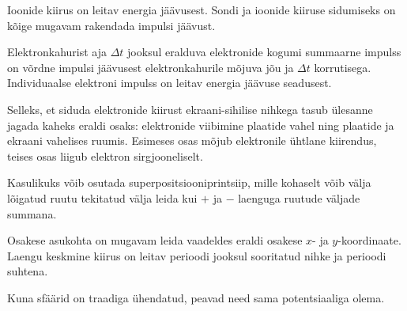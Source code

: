 \documentclass[10pt, twoside]{article}
\begin{document}
{%

\hint
Ioonide kiirus on leitav energia jäävusest. Sondi ja ioonide kiiruse sidumiseks on kõige mugavam rakendada impulsi jäävust.
\probend
\bigskip


\hint
Elektronkahurist aja $\Delta t$ jooksul eralduva elektronide kogumi summaarne impulss on võrdne impulsi jäävusest elektronkahurile mõjuva jõu ja $\Delta t$ korrutisega. Individuaalse elektroni impulss on leitav energia jäävuse seadusest.
\probend
\bigskip


\hint
Selleks, et siduda elektronide kiirust ekraani-sihilise nihkega tasub ülesanne jagada kaheks eraldi osaks: elektronide viibimine plaatide vahel ning plaatide ja ekraani vahelises ruumis. Esimeses osas mõjub elektronile ühtlane kiirendus, teises osas liigub elektron sirgjooneliselt.
\probend
\bigskip


\hint
Kasulikuks võib osutada superpositsiooniprintsiip, mille kohaselt võib välja lõigatud ruutu tekitatud välja leida kui $+$ ja $-$ laenguga ruutude väljade summana.
\probend
\bigskip


\hint
Osakese asukohta on mugavam leida vaadeldes eraldi osakese $x$- ja $y$-koordinaate. Laengu keskmine kiirus on leitav perioodi jooksul sooritatud nihke ja perioodi suhtena.
\probend
\bigskip


\hint
Kuna sfäärid on traadiga ühendatud, peavad need sama potentsiaaliga olema.
\probend
\bigskip


}
\end{document}
